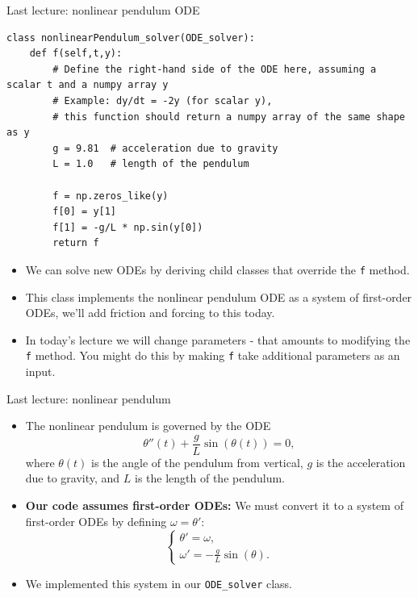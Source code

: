 \documentclass{beamer}
\begin{document}
  \begin{frame}[fragile]{Last lecture: nonlinear pendulum ODE}
    \begin{verbatim}
class nonlinearPendulum_solver(ODE_solver):
    def f(self,t,y):
        # Define the right-hand side of the ODE here, assuming a scalar t and a numpy array y
        # Example: dy/dt = -2y (for scalar y),
        # this function should return a numpy array of the same shape as y
        g = 9.81  # acceleration due to gravity
        L = 1.0   # length of the pendulum

        f = np.zeros_like(y)
        f[0] = y[1]
        f[1] = -g/L * np.sin(y[0])
        return f

    \end{verbatim}

    \begin{itemize}
    \item We can solve new ODEs by deriving child classes that override the \texttt{f} method.
    \item This class implements the nonlinear pendulum ODE as a system of first-order ODEs, we'll add friction and forcing to this today.
    \item In today's lecture we will change parameters - that amounts to modifying the \texttt{f} method. You might do this by making \texttt{f} take additional parameters as an input.
    \end{itemize}
\end{frame}

\begin{frame}{Last lecture: nonlinear pendulum}
  \begin{itemize}
    \item The nonlinear pendulum is governed by the ODE
    \[
      \theta''(t) + \frac{g}{L}\sin(\theta(t)) = 0,
    \]
    where $\theta(t)$ is the angle of the pendulum from vertical, $g$ is the acceleration due to gravity, and $L$ is the length of the pendulum.
    \item \textbf{Our code assumes first-order ODEs:} We must convert it to a system of first-order ODEs by defining $\omega = \theta'$:
    \[
      \begin{cases}
        \theta' = \omega, \\
        \omega' = -\frac{g}{L}\sin(\theta).
      \end{cases}
    \]
    \item We implemented this system in our \texttt{ODE\_solver} class.
  \end{itemize}
\end{frame}
\end{document}
